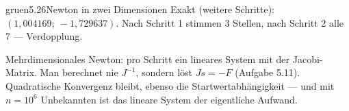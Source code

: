 \begin{loesungkarte}{gruen}{5.26}{Newton in zwei Dimensionen}
Exakt (weitere Schritte): $(1{,}004169;\ -1{,}729637)$. Nach Schritt 1 stimmen $3$ Stellen, nach Schritt 2 alle $7$ --- Verdopplung.
\begin{mitnehmen}\kastentext
Mehrdimensionales Newton: pro Schritt ein lineares System mit der Jacobi-Matrix. Man berechnet nie $J^{-1}$, sondern löst $Js = -F$ (Aufgabe 5.11). Quadratische Konvergenz bleibt, ebenso die Startwertabhängigkeit --- und mit $n = 10^{6}$ Unbekannten ist das lineare System der eigentliche Aufwand.
\end{mitnehmen}
\end{loesungkarte}

